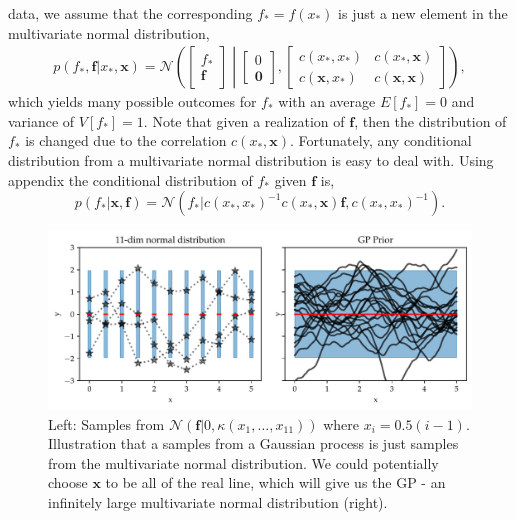     data, we assume that the corresponding $f_* = f(x_*)$ is just a new element in the multivariate
    normal distribution, 
\begin{align}\label{prior_gp}
    p(f_*,\textbf{f}|x_*,\textbf{x}) = \mathcal{N}\left(\begin{bmatrix}
        f_*\\ \textbf{f}
    \end{bmatrix} \middle| \begin{bmatrix}
        0\\ \textbf{0}
    \end{bmatrix}, \begin{bmatrix}
        c(x_*, x_*) & c(x_*,\textbf{x})\\
        c(\textbf{x}, x_*) & c(\textbf{x}, \textbf{x})
    \end{bmatrix} \right), 
\end{align}
which yields many possible outcomes for $f_*$ with an average $E[f_*] = 0$ and variance of $V[f_*] =
1$. Note that given a realization of $\textbf{f}$, then the distribution of $f_*$ is changed due to
the correlation $c(x_*, \textbf{x})$. Fortunately, any conditional distribution from a multivariate
normal distribution is easy to deal with. Using appendix  the
conditional distribution of $f_*$ given $\textbf{f}$ is, 
\begin{equation} \label{conditional_GP}
    p(f_*|\textbf{x}, \textbf{f}) = \mathcal{N}(f_*|c(x_*, x_*)^{-1}c(x_*, \textbf{x})\textbf{f},c(x_*, x_*)^{-1}).
\end{equation}
\begin{figure}
    \centering
    \includegraphics[width = \textwidth]{Pictures/GP_samples_mattern.pdf}
    \caption{Left: Samples from $\mathcal{N}(\textbf{f}|0,\kappa(x_1,\dots, x_{11}))$ where
    $x_i= 0.5(i-1)$. Illustration that a samples from a Gaussian process is just
    samples from the multivariate normal distribution. We could potentially choose
    $\textbf{x}$ to be all of the real line, which will give us the GP - an infinitely
    large multivariate normal distribution (right).}
    \label{GP_illustration}
\end{figure}

